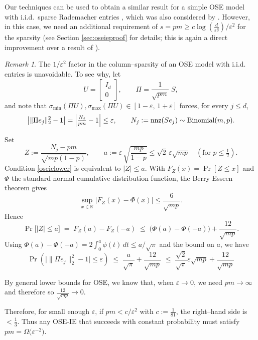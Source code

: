 \documentclass[11pt]{amsart}
\numberwithin{equation}{section}
\numberwithin{equation}{section}
\theoremstyle{remark}
\newtheorem{remark}[theorem]{Remark}
\theoremstyle{definition}
\begin{document}
Our techniques can be used to obtain a similar result for a simple OSE model with i.i.d.~sparse Rademacher entries \cite{achlioptas2003database}, which was also considered by \cite{chenakkod2024optimal}. However, in this case, we need an additional requirement of $s=pm \ge c\log (\frac{d}{\varepsilon\delta})/\varepsilon^2$ for the sparsity (see Section \ref{sec:oseieproof} for details; this is again a direct improvement over a result of \cite{chenakkod2024optimal}).
\begin{remark}
The $1/\varepsilon^{2}$ factor in the column–sparsity of an OSE model with i.i.d. entries is unavoidable.  
To see why, let
\[
  U=\begin{bmatrix}I_{d}\\[2pt] 0\end{bmatrix},
  \qquad
  \Pi=\frac{1}{\sqrt{pm}}\;S ,
\]
and note that
$\sigma_{\min}(\Pi U),\sigma_{\max}(\Pi U)\in[1-\varepsilon,\,1+\varepsilon]$
forces, for every $j\le d$,
\begin{equation}\label{oseielower}
  \bigl|\|\Pi e_j\|_{2}^{2}-1\bigr|
  =\Bigl|\tfrac{N_j}{pm}-1\Bigr|
  \le\varepsilon,
  \qquad
  N_j:=\operatorname{nnz}(S e_j)\sim\operatorname{Binomial}(m,p).
\end{equation}
 
Set
\[
  Z:=\frac{N_j-pm}{\sqrt{mp(1-p)}} ,
  \qquad
  a:=\varepsilon\,\sqrt{\frac{mp}{1-p}}\le\sqrt2\,\varepsilon\sqrt{mp}\quad( \text{for } p\le\tfrac12).
\]
Condition \ref{oseielower} is equivalent to $|Z|\le a$.  
With $F_Z(x)=\Pr[Z\le x]$ and $\Phi$ the standard normal cumulative distribution function,
the Berry Esseen theorem gives
\[
  \sup_{x\in\mathbb R}|F_Z(x)-\Phi(x)|\le\frac{6}{\sqrt{mp}}.
\]
Hence
\[
  \Pr\bigl[|Z|\le a\bigr]
  \;=\;F_Z(a)-F_Z(-a)
  \;\le\;\bigl(\Phi(a)-\Phi(-a)\bigr)+\frac{12}{\sqrt{mp}}.
\]
Using $\Phi(a)-\Phi(-a)=2\int_{0}^{a}\!\phi(t)\,dt\le a/\sqrt{\pi}$ and the bound on $a$, we have
\[
  \Pr\left( \bigl|\|\Pi e_j\|_{2}^{2}-1\bigr| \le \varepsilon \right)
  \;\le\;
  \frac{a}{\sqrt{\pi}}+\frac{12}{\sqrt{mp}}
  \;\le\;
  \frac{\sqrt2}{\sqrt{\pi}}\varepsilon\sqrt{mp}+
  \frac{12}{\sqrt{mp}}
\]

By general lower bounds for OSE, we know that, when $\varepsilon \to 0$, we need $pm \to \infty$ and therefore so $\frac{12}{\sqrt{mp}} \to 0$.

Therefore, for small enough $\varepsilon$, if $pm<c/\varepsilon^{2}$ with $c:=\frac{1}{81}$, the right–hand side is $<\tfrac13$.
Thus any OSE-IE that succeeds with constant probability must satisfy $pm=\Omega\!\bigl(\varepsilon^{-2}\bigr)$.
\end{remark}
\end{document}
